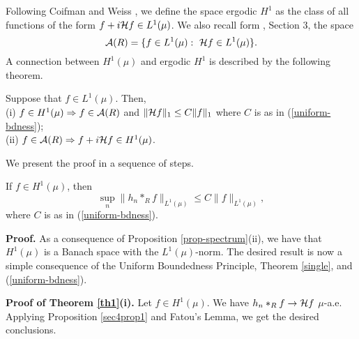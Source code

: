 Following Coifman and Weiss \cite{cw2},
we define the space ergodic $H^1$
as the class of all functions of the
form $f+ i {\cal H} f\in L^1(\mu)$.
We also recall form
\cite{abg2}, Section 3, the space
$${\cal A} (R)=\{f\in L^1(\mu):\ {\cal H} f\in L^1(\mu)\}.$$
A connection between $H^1(\mu)$ and ergodic $H^1$
is described by the following theorem.
\begin{th1}
Suppose that $f\in L^1(\mu)$.  Then,\\
(i)  $f\in H^1(\mu)\Rightarrow f\in {\cal A}(R)$ 
and $\|{\cal H} f\|_1\leq C\|f\|_1$ where $C$ is as in 
(\ref{uniform-bdness});\\
(ii)  $f\in {\cal A}(R)\Rightarrow f+i{\cal H} f\in H^1(\mu)$.\\ 
\label{th1}
\end{th1}
We present
the proof in a sequence
of steps.
\begin{sec4prop1}
If $f\in H^1(\mu)$,
then
$$\sup_n\|h_n*_Rf\|_{L^1(\mu)}\leq C\|f\|_{L^1(\mu)},$$
where $C$ is as in (\ref{uniform-bdness}).
\label{sec4prop1}
\end{sec4prop1}

{\bf Proof.}  As a consequence of 
Proposition \ref{prop-spectrum}(ii),
we have that $H^1(\mu)$ is a Banach space
with the $L^1(\mu)$-norm.  The desired result is now a 
 simple consequence
of the Uniform Boundedness Principle,
Theorem \ref{single}, and (\ref{uniform-bdness}).

{\bf Proof of Theorem \ref{th1}(i).}  
Let $f\in H^1(\mu)$.  
We have $h_n*_Rf\rightarrow {\cal H} f$
$\mu$-a.e.  Applying Proposition \ref{sec4prop1}
and Fatou's Lemma, we get the desired conclusions.

